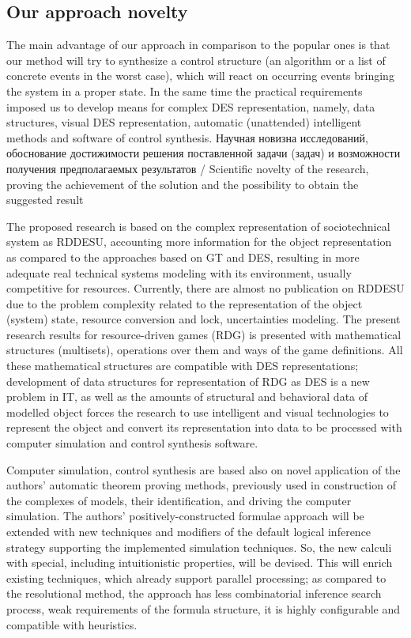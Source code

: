\documentclass[runningheads]{llncs}
\begin{document}
\subsection{Our approach novelty}
\label{sec:oanov}

    The main advantage of our approach in comparison to the popular ones is that our method will try to synthesize a control structure (an algorithm or a list of concrete events in the worst case), which will react on occurring events bringing the system in a proper state. In the same time the practical requirements imposed us to develop means for complex DES representation, namely, data structures, visual DES representation, automatic (unattended) intelligent methods and software of control synthesis.
Научная новизна исследований, обоснование достижимости решения поставленной задачи (задач) и возможности получения предполагаемых результатов / Scientific novelty of the research, proving the achievement of  the solution and the possibility to obtain the suggested result

The proposed research is based on the complex representation of sociotechnical system as RDDESU, accounting more information for the object representation as compared to the approaches based on GT and DES, resulting in more adequate real technical systems modeling with its environment, usually competitive for resources.  Currently, there are almost no publication on RDDESU due to the problem complexity related to the representation of the object (system) state, resource conversion and lock, uncertainties modeling. The present research results for resource-driven games (RDG) is presented with mathematical structures (multisets), operations over them and ways of the game definitions. All these mathematical structures are compatible with DES representations; development of data structures for representation of RDG as DES is a new problem in IT, as well as the amounts of structural and behavioral data of modelled object  forces the research to use intelligent and visual technologies to represent the object and convert its representation into data to be processed with computer simulation and control synthesis software.

Computer simulation, control synthesis are based also on novel application of the authors’ automatic theorem proving methods, previously used in construction of the complexes of models, their identification, and driving the computer simulation. The authors’ positively-constructed formulae approach will be extended with new techniques and modifiers of the default logical inference strategy supporting the implemented simulation techniques. So, the new calculi with special, including intuitionistic properties, will be devised. This will enrich existing techniques, which already support parallel processing; as compared to the resolutional method, the approach has less combinatorial inference search process, weak requirements of the formula structure, it is highly configurable and compatible with heuristics.
\end{document}
